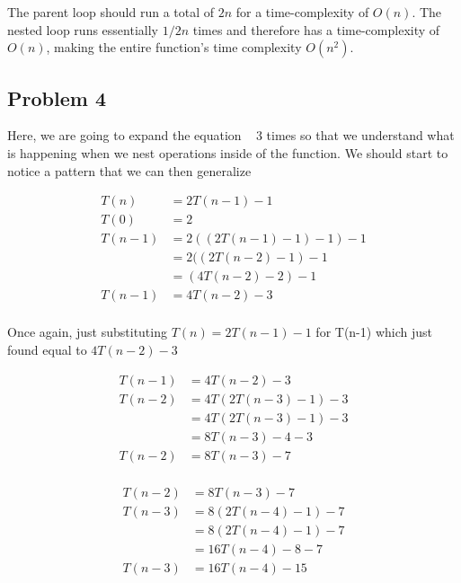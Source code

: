 \documentclass{article}
\begin{document}
The parent loop should run a total of $2n$ for a time-complexity of $O(n)$. The nested loop runs
essentially $1/2n$ times and therefore has a time-complexity of $O(n)$, making the entire function's
time complexity $O(n^2)$. 

\subsection{Problem 4}

Here, we are going to expand the equation ~ 3 times so that we understand what is happening when we nest 
operations inside of the function. We should start to notice a pattern that we can then generalize

\begin{equation}
    \begin{split} 
        T(n) &= 2T(n - 1) - 1 \\
        T(0) &= 2 \\
        T(n-1) &= 2((2T(n - 1) - 1) -1) -1 \\ 
        &= 2((2T(n - 2) -1) -1 \\ 
        &= (4T(n - 2) -2) -1 \\ 
        T(n-1) &= 4T(n - 2) -3 \\
    \end{split} 
\end{equation}

Once again, just substituting $T(n) = 2T(n - 1) - 1$ for T(n-1) which just found equal to $4T(n - 2) -3$

\begin{equation}
    \begin{split} 
        T(n-1) &= 4T(n - 2) -3 \\
        T(n-2) &= 4T(2T(n - 3) - 1) -3 \\
        &= 4T(2T(n - 3) - 1) -3 \\
        &= 8T(n - 3) - 4 - 3 \\
        T(n-2) &= 8T(n - 3) - 7 \\
    \end{split} 
\end{equation}

\begin{equation}
    \begin{split}
        T(n-2) &= 8T(n - 3) - 7 \\
        T(n-3) &= 8(2T(n - 4) - 1) - 7 \\
        &= 8(2T(n - 4) - 1) - 7 \\
        &= 16T(n - 4) - 8 - 7 \\
        T(n-3) &= 16T(n - 4) - 15 \\
    \end{split}
\end{equation}
\end{document}

